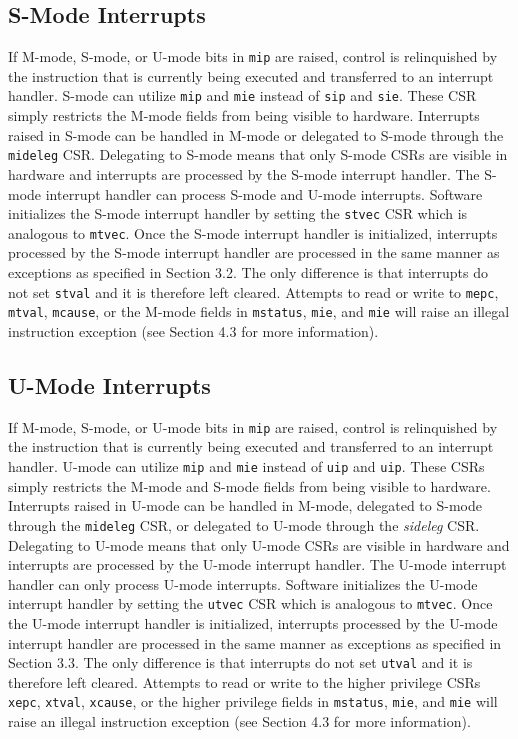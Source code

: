 \documentclass[12pt]{article}
\begin{document}
\subsection{S-Mode Interrupts}
If M-mode, S-mode, or U-mode bits in {\tt{mip}} are raised, control is relinquished by the instruction that is currently being executed and transferred to an interrupt handler. S-mode can utilize {\tt{mip}} and {\tt{mie}} instead of {\tt{sip}} and {\tt{sie}}. These CSR simply restricts the M-mode fields from being visible to hardware. Interrupts raised in S-mode can be handled in M-mode or delegated to S-mode through the {\tt{mideleg}} CSR. Delegating to S-mode means that only S-mode CSRs are visible in hardware and interrupts are processed by the S-mode interrupt handler. The S-mode interrupt handler can process S-mode and U-mode interrupts. Software initializes the S-mode interrupt handler by setting the {\tt{stvec}} CSR which is analogous to {\tt{mtvec}}. Once the S-mode interrupt handler is initialized, interrupts processed by the S-mode interrupt handler are processed in the same manner as exceptions as specified in Section 3.2. The only difference is that interrupts do not set {\tt{stval}} and it is therefore left cleared. Attempts to read or write to {\tt{mepc}}, {\tt{mtval}}, {\tt{mcause}}, or the M-mode fields in {\tt{mstatus}}, {\tt{mie}}, and {\tt{mie}} will raise an illegal instruction exception (see Section 4.3 for more information). 

\subsection{U-Mode Interrupts}
If M-mode, S-mode, or U-mode bits in {\tt{mip}} are raised, control is relinquished by the instruction that is currently being executed and transferred to an interrupt handler. U-mode can utilize {\tt{mip}} and {\tt{mie}} instead of {\tt{uip}} and {\tt{uip}}. These CSRs simply restricts the M-mode and S-mode fields from being visible to hardware. Interrupts raised in U-mode can be handled in M-mode, delegated to S-mode through the {\tt{mideleg}} CSR, or delegated to U-mode through the \emph{sideleg} CSR. Delegating to U-mode means that only U-mode CSRs are visible in hardware and interrupts are processed by the U-mode interrupt handler. The U-mode interrupt handler can only process U-mode interrupts. Software initializes the U-mode interrupt handler by setting the {\tt{utvec}} CSR which is analogous to {\tt{mtvec}}. Once the U-mode interrupt handler is initialized, interrupts processed by the U-mode interrupt handler are processed in the same manner as exceptions as specified in Section 3.3. The only difference is that interrupts do not set {\tt{utval}} and it is therefore left cleared. Attempts to read or write to the higher privilege CSRs {\tt{xepc}}, {\tt{xtval}}, {\tt{xcause}}, or the higher privilege fields in {\tt{mstatus}}, {\tt{mie}}, and {\tt{mie}} will raise an illegal instruction exception (see Section 4.3 for more information).
\end{document}

